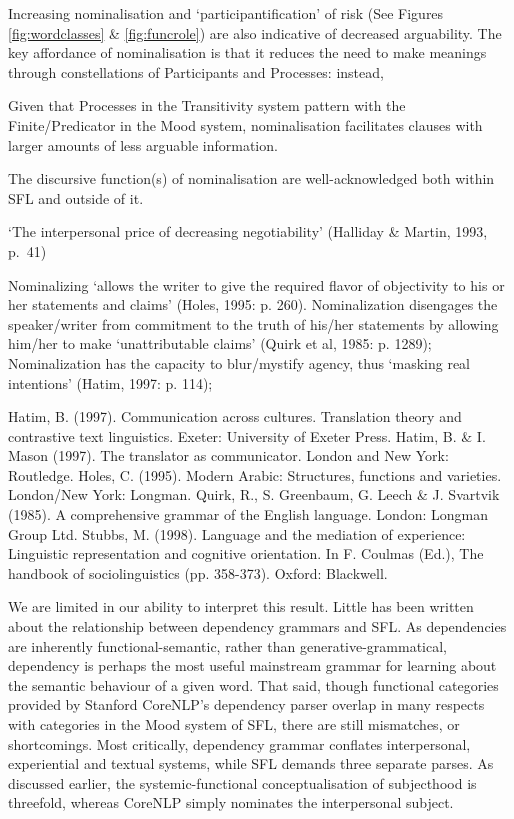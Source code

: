             Increasing nominalisation and `participantification' of risk (See Figures \ref{fig:wordclasses} \& \ref{fig:funcrole}) are also indicative of decreased arguability. The key affordance of nominalisation is that it reduces the need to make meanings through constellations of Participants and Processes: instead, 



            Given that Processes in the Transitivity system pattern with the Finite\slash Predicator in the Mood system, nominalisation facilitates clauses with larger amounts of less arguable information.

            The discursive function(s) of nominalisation are well-acknowledged both within SFL and outside of it.

            `The interpersonal price of decreasing negotiability' (Halliday \& Martin, 1993, p.~41)

            Nominalizing `allows the writer to give the required flavor of objectivity to his or her statements and claims' (Holes, 1995: p. 260). 
            Nominalization disengages the speaker/writer from commitment to the truth of his/her statements by allowing him/her to make `unattributable claims' (Quirk et al, 1985: p. 1289);
            Nominalization has the capacity to blur/mystify agency, thus `masking real intentions' (Hatim, 1997: p. 114);

            Hatim, B. (1997). Communication across cultures. Translation theory and contrastive text linguistics. Exeter: University of Exeter Press.
            Hatim, B.  \& I. Mason (1997). The translator as communicator. London and New York: Routledge.
            Holes, C. (1995). Modern Arabic: Structures, functions and varieties. London/New York: Longman.
            Quirk, R., S. Greenbaum, G. Leech \& J. Svartvik (1985). A comprehensive grammar of the English language. London: Longman Group Ltd. 
            Stubbs, M. (1998). Language and the mediation of experience: Linguistic representation and cognitive orientation. In F. Coulmas (Ed.), The handbook of sociolinguistics (pp. 358-373). Oxford: Blackwell. 







            We are limited in our ability to interpret this result. Little has been written about the relationship between dependency grammars and SFL. As dependencies are inherently functional-semantic, rather than generative-grammatical, dependency is perhaps the most useful  mainstream grammar for learning about the semantic behaviour of a given word. That said, though functional categories provided by Stanford CoreNLP's dependency parser overlap in many respects with categories in the Mood system of SFL, there are still mismatches, or shortcomings. Most critically, dependency grammar conflates interpersonal, experiential and textual systems, while SFL demands three separate parses. As discussed earlier, the systemic-functional conceptualisation of subjecthood is threefold, whereas CoreNLP simply nominates the interpersonal subject.

